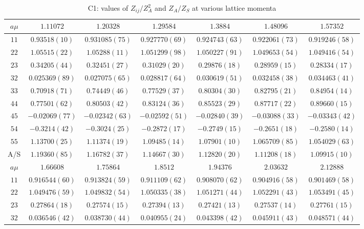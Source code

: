 \begin{table}
\begin{center}
\caption{C1: values of $Z_{ij}/Z_A^2$ and $Z_A/Z_S$ at various lattice momenta}
\begin{tabular}{c|c c c c c c}
\hline
\hline
$a\mu$ & $1.11072$ & $1.20328$ & $1.29584$ & $1.3884$ & $1.48096$ & $1.57352$ \\
\hline
$11$ & $0.93518(10)$ & $0.931085(75)$ & $0.927770(69)$ & $0.924743(63)$ & $0.922061(73)$ & $0.919246(58)$ \\
$22$ & $1.05515(22)$ & $1.05288(11)$ & $1.051299(98)$ & $1.050227(91)$ & $1.049653(54)$ & $1.049416(54)$ \\
$23$ & $0.34205(44)$ & $0.32451(27)$ & $0.31029(20)$ & $0.29876(18)$ & $0.28959(15)$ & $0.28334(17)$ \\
$32$ & $0.025369(89)$ & $0.027075(65)$ & $0.028817(64)$ & $0.030619(51)$ & $0.032458(38)$ & $0.034463(41)$ \\
$33$ & $0.70918(71)$ & $0.74449(46)$ & $0.77529(37)$ & $0.80304(30)$ & $0.82795(21)$ & $0.84954(14)$ \\
$44$ & $0.77501(62)$ & $0.80503(42)$ & $0.83124(36)$ & $0.85523(29)$ & $0.87717(22)$ & $0.89660(15)$ \\
$45$ & $-0.02069(77)$ & $-0.02342(63)$ & $-0.02592(51)$ & $-0.02840(39)$ & $-0.03088(33)$ & $-0.03343(42)$ \\
$54$ & $-0.3214(42)$ & $-0.3024(25)$ & $-0.2872(17)$ & $-0.2749(15)$ & $-0.2651(18)$ & $-0.2580(14)$ \\
$55$ & $1.13700(25)$ & $1.11374(19)$ & $1.09485(14)$ & $1.07901(10)$ & $1.065709(85)$ & $1.054029(63)$ \\
\hline
A/S & $1.19360(85)$ & $1.16782(37)$ & $1.14667(30)$ & $1.12820(20)$ & $1.11208(18)$ & $1.09915(10)$ \\
\hline
$a\mu$ & $1.66608$ & $1.75864$ & $1.8512$ & $1.94376$ & $2.03632$ & $2.12888$ \\
\hline
$11$ & $0.916544(60)$ & $0.913824(59)$ & $0.911109(62)$ & $0.908070(62)$ & $0.904916(58)$ & $0.901469(58)$ \\
$22$ & $1.049476(59)$ & $1.049832(54)$ & $1.050335(38)$ & $1.051271(44)$ & $1.052291(43)$ & $1.053491(45)$ \\
$23$ & $0.27864(18)$ & $0.27574(15)$ & $0.27394(13)$ & $0.27421(13)$ & $0.27537(14)$ & $0.27761(15)$ \\
$32$ & $0.036546(42)$ & $0.038730(44)$ & $0.040955(24)$ & $0.043398(42)$ & $0.045911(43)$ & $0.048571(44)$ \\

\end{tabular}
\end{center}
\end{table}
